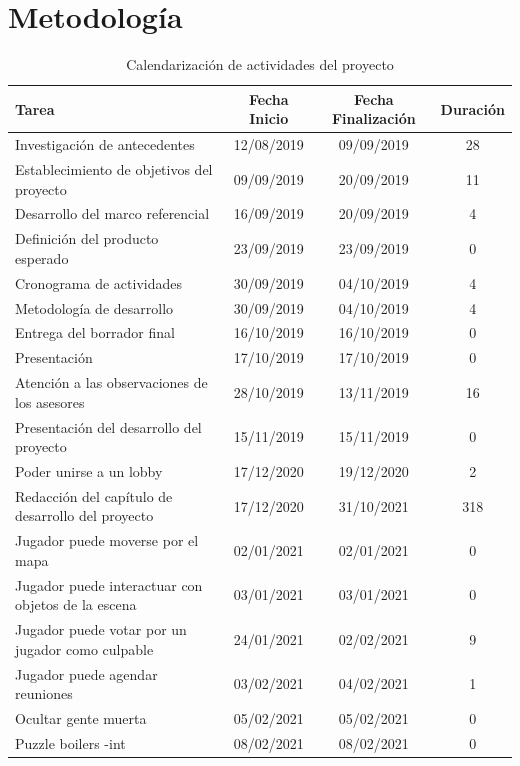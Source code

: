 \section{Metodología}
\begin{longtable}[c]{|m{5cm}|c|c|c|}
\caption{Calendarización de actividades del proyecto \label{table:fechas_actividades}}\\
\hline
        Tarea & Fecha Inicio & Fecha Finalización & Duración \\ \hline
        Investigación de antecedentes & 12/08/2019 & 09/09/2019 & 28 \\ \hline
        Establecimiento de objetivos del proyecto & 09/09/2019 & 20/09/2019 & 11 \\ \hline
        Desarrollo del marco referencial & 16/09/2019 & 20/09/2019 & 4 \\ \hline
        Definición del producto esperado & 23/09/2019 & 23/09/2019 & 0 \\ \hline
        Cronograma de actividades & 30/09/2019 & 04/10/2019 & 4 \\ \hline
        Metodología de desarrollo & 30/09/2019 & 04/10/2019 & 4 \\ \hline
        Entrega del borrador final & 16/10/2019 & 16/10/2019 & 0 \\ \hline
        Presentación & 17/10/2019 & 17/10/2019 & 0 \\ \hline
        Atención a las observaciones de los asesores & 28/10/2019 & 13/11/2019 & 16 \\ \hline
        Presentación del desarrollo del proyecto & 15/11/2019 & 15/11/2019 & 0 \\ \hline
        Poder unirse a un lobby & 17/12/2020 & 19/12/2020 & 2 \\ \hline
        Redacción del capítulo de desarrollo del proyecto & 17/12/2020 & 31/10/2021 & 318 \\ \hline
        Jugador puede moverse por el mapa & 02/01/2021 & 02/01/2021 & 0 \\ \hline
        Jugador puede interactuar con objetos de la escena & 03/01/2021 & 03/01/2021 & 0 \\ \hline
        Jugador puede votar por un jugador como culpable & 24/01/2021 & 02/02/2021 & 9 \\ \hline
        Jugador puede agendar reuniones & 03/02/2021 & 04/02/2021 & 1 \\ \hline
        Ocultar gente muerta & 05/02/2021 & 05/02/2021 & 0 \\ \hline
        Puzzle boilers -int & 08/02/2021 & 08/02/2021 & 0 \\ \hline

\end{longtable}
